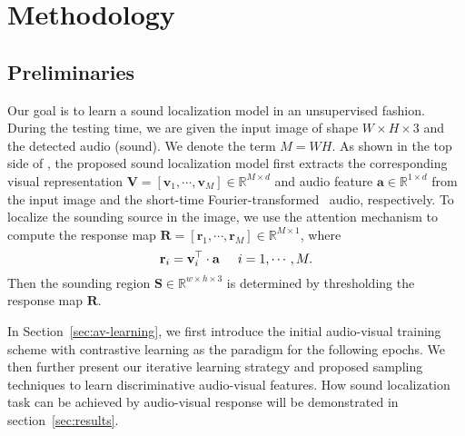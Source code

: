 
\section{Methodology}
\label{sec:method}

\subsection{Preliminaries}
Our goal is to learn a sound localization model in an unsupervised fashion.
%
During the testing time, we are given the input image of shape $W\times H\times 3$ and the detected audio (\ie sound).
%
We denote the term $M=WH$.
%
As shown in the top side of , the proposed sound localization model first extracts the corresponding visual representation $\mathbf{V}=[\mathbf{v}_1,\cdots,\mathbf{v}_M]\in\mathbb{R}^{M \times d}$ and audio feature $\mathbf{a}\in\mathbb{R}^{1 \times d}$ from the input image and the short-time Fourier-transformed~\cite{stft} audio, respectively.
%
To localize the sounding source in the image, we use the attention mechanism to compute the response map $\mathbf{R}=[\mathbf{r}_1,\cdots,\mathbf{r}_M]\in\mathbb{R}^{M\times 1}$, where
\begin{equation}
    \mathbf{r}_i = \mathbf{v}_i^\top \cdot \mathbf{a}\hspace{5mm} i = 1,\cdots,M.
\end{equation}
%
Then the sounding region $\mathbf{S}\in\mathbb{R}^{w\times h\times 3}$ is determined by thresholding the response map $\mathbf{R}$.


In Section~\ref{sec:av-learning}, we first introduce the initial audio-visual training scheme with contrastive learning as the paradigm for the following epochs. 
% 
We then further present our iterative learning strategy and proposed sampling techniques to learn discriminative audio-visual features. 
% 
How sound localization task can be achieved by audio-visual response will be demonstrated in section~\ref{sec:results}.


